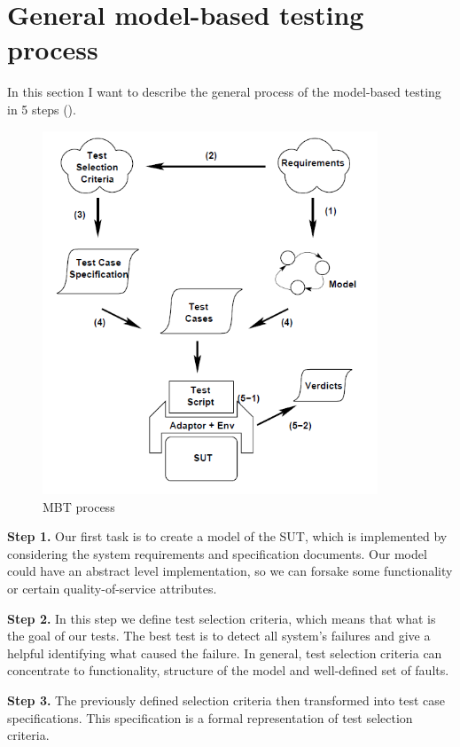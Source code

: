 \section{General model-based testing process}

In this section I want to describe the general process of the model-based testing in 5 steps (). 

\begin{figure}[!ht]
	\centering
	\includegraphics[width=100mm, keepaspectratio]{figures/MBTprocess.png}
	\caption{MBT process}
	\label{fig:mbtprocess}
\end{figure}

\textbf{Step 1.}
Our first task is to create a model of the SUT, which is implemented by considering the system requirements and specification documents. Our model could have an abstract level implementation, so we can forsake some functionality or certain quality-of-service attributes.

\textbf{Step 2.}
In this step we define test selection criteria, which means that what is the goal of our tests. The best test is to detect all system's failures and give a helpful identifying what caused the failure. In general, test selection criteria can concentrate to functionality, structure of the model and well-defined set of faults.

\textbf{Step 3.}
The previously defined selection criteria then transformed into test case specifications. This specification is a formal representation of test selection criteria. 

